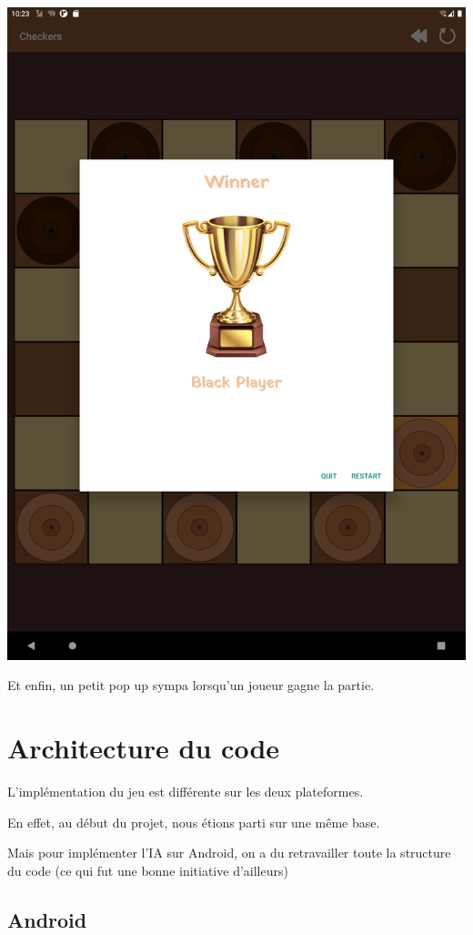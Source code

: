 \documentclass{article}
\begin{document}
\begin{center}
  \includegraphics[scale=0.1]{pop_up_victoire_tablet.png}
\end{center}


Et enfin, un petit pop up sympa lorsqu'un joueur gagne la partie.

\section{Architecture du code}

L'implémentation du jeu est différente sur les deux plateformes.

En effet, au début du projet, nous étions parti sur une même base.

Mais pour implémenter l'IA sur Android, on a du retravailler toute la structure du code
 (ce qui fut une bonne initiative d'ailleurs)

\subsection{Android} %
\end{document}
